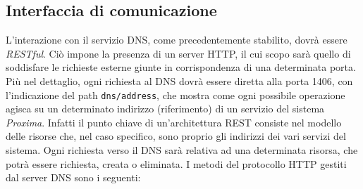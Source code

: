 \documentclass[a4paper,12pt]{report}
\begin{document}
\subsection{Interfaccia di comunicazione} \label{dns-communication}
L'interazione con il servizio DNS, come precedentemente stabilito, dovrà essere \emph{RESTful}. Ciò impone la presenza di un server HTTP, il cui scopo sarà quello di soddisfare le richieste esterne giunte in corrispondenza di una determinata porta. Più nel dettaglio, ogni richiesta al DNS dovrà essere diretta alla porta 1406, con l'indicazione del path \texttt{dns/address}, che mostra come ogni possibile operazione agisca su un determinato indirizzo (riferimento) di un servizio del sistema \emph{Proxima}. Infatti il punto chiave di un'architettura REST consiste nel modello delle risorse che, nel caso specifico, sono proprio gli indirizzi dei vari servizi del sistema. Ogni richiesta verso il DNS sarà relativa ad una determinata risorsa, che potrà essere richiesta, creata o eliminata. I metodi del protocollo HTTP gestiti dal server DNS sono i seguenti:
\end{document}
